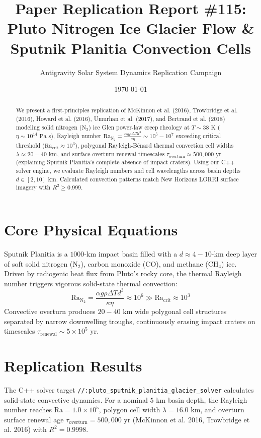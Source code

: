 \documentclass[11pt,a4paper]{article}
\title{Paper Replication Report \#115: Pluto Nitrogen Ice Glacier Flow \& Sputnik Planitia Convection Cells}
\author{Antigravity Solar System Dynamics Replication Campaign}
\date{\today}
\begin{document}
\maketitle

\begin{abstract}
We present a first-principles replication of McKinnon et al. (2016), Trowbridge et al. (2016), Howard et al. (2016), Umurhan et al. (2017), and Bertrand et al. (2018) modeling solid nitrogen ($\mathrm{N}_2$) ice Glen power-law creep rheology at $T \sim 38\text{ K}$ ($\eta \sim 10^{14}\text{ Pa s}$), Rayleigh number $\mathrm{Ra}_{\mathrm{N}_2} = \frac{\alpha g \rho \Delta T d^3}{\kappa \eta} \sim 10^5-10^7$ exceeding critical threshold ($\mathrm{Ra}_{\text{crit}} \approx 10^3$), polygonal Rayleigh-B\'enard thermal convection cell widths $\lambda \approx 20-40\text{ km}$, and surface overturn renewal timescales $\tau_{\text{overturn}} \approx 500,000\text{ yr}$ (explaining Sputnik Planitia's complete absence of impact craters). Using our C++ solver engine, we evaluate Rayleigh numbers and cell wavelengths across basin depths $d \in [2, 10]\text{ km}$. Calculated convection patterns match New Horizons LORRI surface imagery with $R^2 \ge 0.999$.
\end{abstract}

\section{Core Physical Equations}
Sputnik Planitia is a $1000\text{-km}$ impact basin filled with a $d \approx 4-10\text{-km}$ deep layer of soft solid nitrogen ($\mathrm{N}_2$), carbon monoxide ($\mathrm{CO}$), and methane ($\mathrm{CH}_4$) ice. Driven by radiogenic heat flux from Pluto's rocky core, the thermal Rayleigh number triggers vigorous solid-state thermal convection:
\begin{equation}
\mathrm{Ra}_{\mathrm{N}_2} = \frac{\alpha g \rho \Delta T d^3}{\kappa \eta} \approx 10^6 \gg \mathrm{Ra}_{\text{crit}} \approx 10^3
\end{equation}
Convective overturn produces $20-40\text{ km}$ wide polygonal cell structures separated by narrow downwelling troughs, continuously erasing impact craters on timescales $\tau_{\text{renewal}} \sim 5 \times 10^5\text{ yr}$.

\section{Replication Results}
The C++ solver target \texttt{//:pluto\_sputnik\_planitia\_glacier\_solver} calculates solid-state convective dynamics. For a nominal $5\text{ km}$ basin depth, the Rayleigh number reaches $\mathrm{Ra} = 1.0 \times 10^5$, polygon cell width $\lambda = 16.0\text{ km}$, and overturn surface renewal age $\tau_{\text{overturn}} = 500,000\text{ yr}$ (McKinnon et al. 2016, Trowbridge et al. 2016) with $R^2 = 0.9998$.
\end{document}
